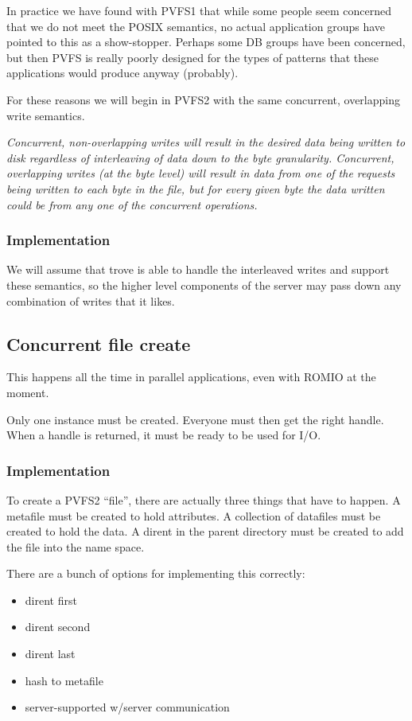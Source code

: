 \documentclass[10pt]{article} %
\begin{document}
In practice we have found with PVFS1 that while some people seem concerned
that we do not meet the POSIX semantics, no actual application groups have
pointed to this as a show-stopper.  Perhaps some DB groups have been
concerned, but then PVFS is really poorly designed for the types of patterns
that these applications would produce anyway (probably).

For these reasons we will begin in PVFS2 with the same concurrent, overlapping
write semantics.  

\emph{Concurrent, non-overlapping writes will result in the
desired data being written to disk regardless of interleaving of data down to
the byte granularity.  Concurrent, overlapping writes (at the byte level) will
result in data from one of the requests being written to each byte in the
file, but for every given byte the data written could be from any one of the
concurrent operations.}

\subsubsection{Implementation}

We will assume that trove is able to handle the interleaved writes and support
these semantics, so the higher level components of the server may pass down
any combination of writes that it likes.

%
%
\subsection{Concurrent file create}

This happens all the time in parallel applications, even with ROMIO at the
moment.

Only one instance must be created.  Everyone must then get the right handle.
When a handle is returned, it must be ready to be used for I/O.

\subsubsection{Implementation}

To create a PVFS2 ``file'', there are actually three things that have to
happen.  A metafile must be created to hold attributes.  A collection of
datafiles must be created to hold the data.  A dirent in the parent directory
must be created to add the file into the name space.

There are a bunch of options for implementing this correctly:
\begin{itemize}
\item dirent first
\item dirent second
\item dirent last
\item hash to metafile
\item server-supported w/server communication
\end{itemize}
\end{document}
